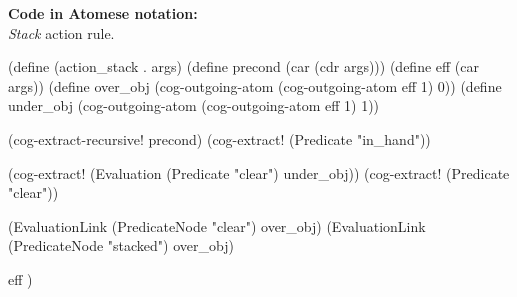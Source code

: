 \begin{footnotesize}
\textbf{Code in Atomese notation:} \\
\textit{Stack} action rule.
\end{footnotesize}

\begin{python}
(define (action_stack . args)
  (define precond (car (cdr args)))
  (define eff (car args))
  (define over_obj 
    (cog-outgoing-atom (cog-outgoing-atom eff 1) 0))
  (define under_obj 
    (cog-outgoing-atom (cog-outgoing-atom eff 1) 1))

  (cog-extract-recursive! precond)
  (cog-extract! (Predicate "in_hand"))

  (cog-extract! (Evaluation (Predicate "clear") under_obj))
  (cog-extract! (Predicate "clear"))

  (EvaluationLink (PredicateNode "clear") over_obj)
  (EvaluationLink (PredicateNode "stacked") over_obj)

  eff
)


\end{python}
